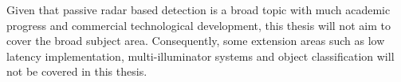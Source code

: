 \noindent
Given that passive radar based detection is a broad topic with much academic progress and commercial technological development, this thesis will not aim to cover the broad subject area. Consequently, some extension areas such as low latency implementation, multi-illuminator systems and object classification will not be covered in this thesis.

